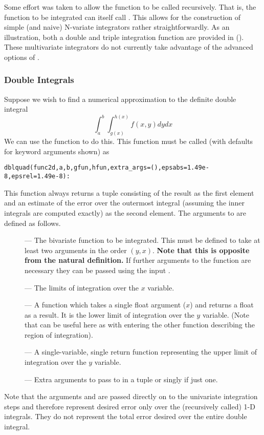 Some effort was taken to allow the function  to be called
recursively.  That is, the function to be integrated can itself call
.  This allows for the construction of simple (and naive) N-variate
integrators rather straightforwardly.  As an illustration, both a
double and triple integration function are provided in
 ().  These multivariate integrators do
not currently take advantage of the advanced options of .

\subsubsection{Double Integrals}

Suppose we wish to find a numerical approximation to the definite
double integral
\[
\int_a^b \int_{g(x)}^{h(x)} f(x,y) dy dx
\]
We can use the function  to do this.  This function must
be called (with defaults for keyword arguments shown) as
\begin{verbatim}
dblquad(func2d,a,b,gfun,hfun,extra_args=(),epsabs=1.49e-8,epsrel=1.49e-8):
\end{verbatim}
This function always returns a tuple consisting of the result as the
first element and an estimate of the error over the outermost integral
(assuming the inner integrals are computed exactly) as the second
element. The arguments to  are defined as follows.
\begin{description}
\item[] --- The bivariate function to be integrated.  This
must be defined to take at least two arguments in the order $(y,x)$.
\textbf{Note that this is opposite from the natural definition.}  If
further arguments to the function are necessary they can be passed
using the input .
\item[] --- The limits of integration over the $x$ variable.
\item[] --- A function which takes a single float argument ($x$)
and returns a float as a result.  It is the lower limit of integration
over the $y$ variable.  (Note that  can be useful
here as with entering the other function describing the region of
integration).
\item[] --- A single-variable, single return function
representing the upper limit of integration over the $y$ variable.
\item[] --- Extra arguments to pass to 
in a tuple or singly if just one.
\end{description}
Note that the arguments  and  are passed
directly on to the univariate integration steps and therefore
represent desired error only over the (recursively called) 1-D
integrals.  They do not represent the total error desired over the
entire double integral. 

